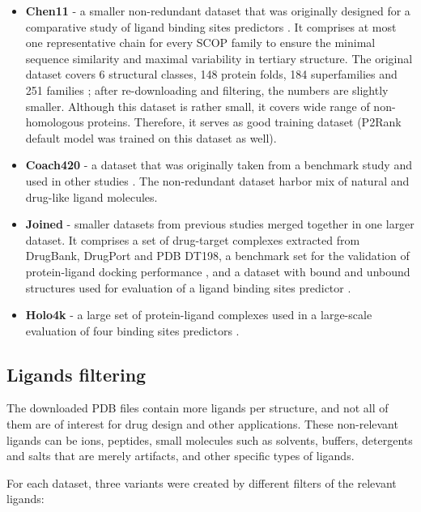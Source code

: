 \begin{itemize}
  \item \textbf{Chen11}
  - a smaller non-redundant dataset that was originally designed for a comparative study of ligand binding sites predictors \cite{benchmark}. It comprises at most one representative chain for every SCOP family \cite{scop} to ensure the minimal sequence similarity and maximal variability in tertiary structure. The original dataset covers 6 structural classes, 148 protein folds, 184 superfamilies and 251 families \cite{benchmark}; after re-downloading and filtering, the numbers are slightly smaller. Although this dataset is rather small, it covers wide range of non-homologous proteins. Therefore, it serves as good training dataset (P2Rank default model was trained on this dataset as well).
  
  \item \textbf{Coach420}
  - a dataset that was originally taken from a benchmark study \cite{cofactor} and used in other studies \cite{coach, p2rank1}. The non-redundant dataset harbor mix of natural and drug-like ligand molecules.
  
  \item \textbf{Joined}
  - smaller datasets from previous studies merged together in one larger dataset. It comprises a set of drug-target complexes extracted from DrugBank, DrugPort and PDB DT198\cite{dt}, a benchmark set for the validation of protein-ligand docking performance \cite{astex}, and a dataset with bound and unbound structures used for evaluation of a ligand binding sites predictor \cite{ligsite}.
  
  \item \textbf{Holo4k}
  - a large set of protein-ligand complexes used in a large-scale evaluation of four binding sites predictors \cite{holo4k}.
\end{itemize}


\subsection{Ligands filtering}

The downloaded PDB files contain more ligands per structure, and not all of them are of interest for drug design and other applications. These non-relevant ligands can be ions, peptides, small molecules such as solvents, buffers, detergents and salts that are merely artifacts, and other specific types of ligands.

For each dataset, three variants were created by different filters of the relevant ligands:

